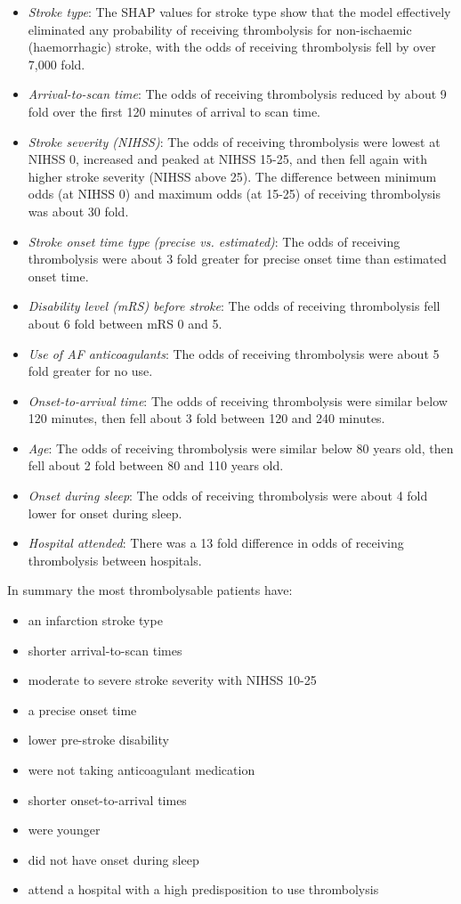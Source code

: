 \begin{itemize}
    \item \emph{Stroke type}: The SHAP values for stroke type show that the model effectively eliminated any probability of receiving thrombolysis for non-ischaemic (haemorrhagic) stroke, with the odds of receiving thrombolysis fell by over 7,000 fold.
    \item \emph{Arrival-to-scan time}: The odds of receiving thrombolysis reduced by about 9 fold over the first 120 minutes of arrival to scan time.
    \item \emph{Stroke severity (NIHSS)}: The odds of receiving thrombolysis were lowest at NIHSS 0, increased and peaked at NIHSS 15-25, and then fell again with higher stroke severity (NIHSS above 25). The difference between minimum odds (at NIHSS 0) and maximum odds (at 15-25) of receiving thrombolysis was about 30 fold.
    \item \emph{Stroke onset time type (precise vs. estimated)}: The odds of receiving thrombolysis were about 3 fold greater for precise onset time than estimated onset time.
    \item \emph{Disability level (mRS) before stroke}: The odds of receiving thrombolysis fell about 6 fold between mRS 0 and 5.
    \item \emph{Use of AF anticoagulants}: The odds of receiving thrombolysis were about 5 fold greater for no use.
    \item \emph{Onset-to-arrival time}: The odds of receiving thrombolysis were similar below 120 minutes, then fell about 3 fold between 120 and 240 minutes.
    \item \emph{Age}: The odds of receiving thrombolysis were similar below 80 years old, then fell about 2 fold between 80 and 110 years old.    
    \item \emph{Onset during sleep}: The odds of receiving thrombolysis were about 4 fold lower for onset during sleep.
    \item \emph{Hospital attended}: There was a 13 fold difference in odds of receiving thrombolysis between hospitals.
\end{itemize}

In summary the most thrombolysable patients have:
\begin{itemize}
    \item an infarction stroke type
    \item shorter arrival-to-scan times
    \item moderate to severe stroke severity with NIHSS 10-25
    \item a precise onset time
    \item lower pre-stroke disability
    \item were not taking anticoagulant medication
    \item shorter onset-to-arrival times
    \item were younger
    \item did not have onset during sleep
    \item attend a hospital with a high predisposition to use thrombolysis
\end{itemize}

